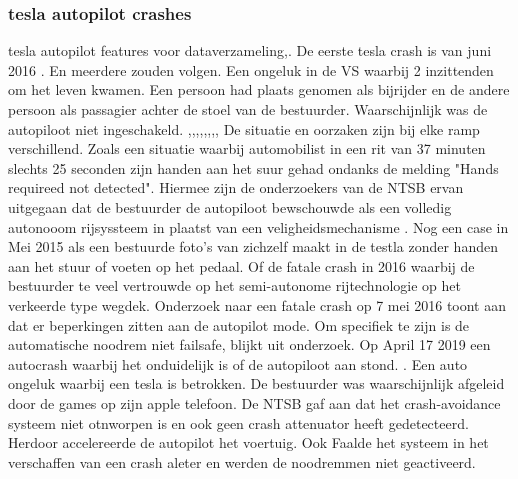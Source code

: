\documentclass{article}
\begin{document}
	\subsubsection{tesla autopilot crashes}
	tesla autopilot features voor dataverzameling\cite{denneyjdsupraFeds},\cite{gritti24062020tesladataengine}.
	De eerste tesla crash is van juni 2016 \cite{impakterTeslaCrash}. En meerdere zouden volgen.
	Een ongeluk in  de VS waarbij 2 inzittenden om het leven kwamen. Een persoon had plaats genomen als bijrijder en de andere persoon als passagier achter de stoel van de bestuurder. Waarschijnlijk was de autopiloot niet ingeschakeld.
	\cite{anderson30042021secondteslacrash},\cite{raynal20042021probeTeslaCrash},\cite{firstpress11052021fatalnonautopilot},\cite{cochran18042021nodriverTeslaCrash},\cite{gitlin11052021autopilot},\cite{sommerfield12072021NHTSAmandateresult},\cite{hawkins30062021nhtsarequiresreporting},\cite{wilson19042021teslacrashregulators},\cite{mcfarland22042021selfdrivingrisks}
	De situatie en oorzaken zijn bij elke ramp verschillend. 
	Zoals een situatie waarbij automobilist  in een rit van 37 minuten slechts 25 seconden zijn handen aan het suur gehad ondanks de melding "Hands requireed not detected". Hiermee zijn de onderzoekers van de NTSB ervan uitgegaan dat de bestuurder de autopiloot bewschouwde als een volledig autonooom rijsyssteem in plaatst van een veligheidsmechanisme
	\cite{oremus21062017fatalTeslaCrash}. 
	Nog een case in Mei 2015 als een bestuurde foto's van zichzelf maakt in de testla zonder handen aan het stuur of voeten op het pedaal.
	\cite{guardian15052021teslacrashHandsOnWheel}
	Of de fatale crash in 2016 waarbij de bestuurder  te veel vertrouwde op het semi-autonome rijtechnologie op het verkeerde type wegdek.
	\cite{Puzzanghera13092017TeslaSharesBlame}
	Onderzoek naar een fatale crash op 7 mei 2016 toont aan dat er beperkingen zitten aan de autopilot mode. Om specifiek te zijn is de automatische noodrem niet failsafe, blijkt uit onderzoek.
	\cite{jaillet02022017teslaAutopilotLimitations}
	\cite{reuters03102019teslaAutoParkingFail}
	\cite{dowling23042021}
	Op  April 17 2019 een autocrash waarbij het onduidelijk is of de autopiloot aan stond.
	\cite{young05112021fatalTeslaReport}. Een auto ongeluk waarbij een tesla is betrokken. De bestuurder was waarschijnlijk afgeleid door de games op zijn apple telefoon. De NTSB gaf aan dat het crash-avoidance systeem niet otnworpen is en ook geen crash attenuator heeft gedetecteerd. Herdoor accelereerde de autopilot  het voertuig. Ook Faalde het systeem in het verschaffen van een crash aleter en werden de noodremmen niet geactiveerd.
\end{document}
